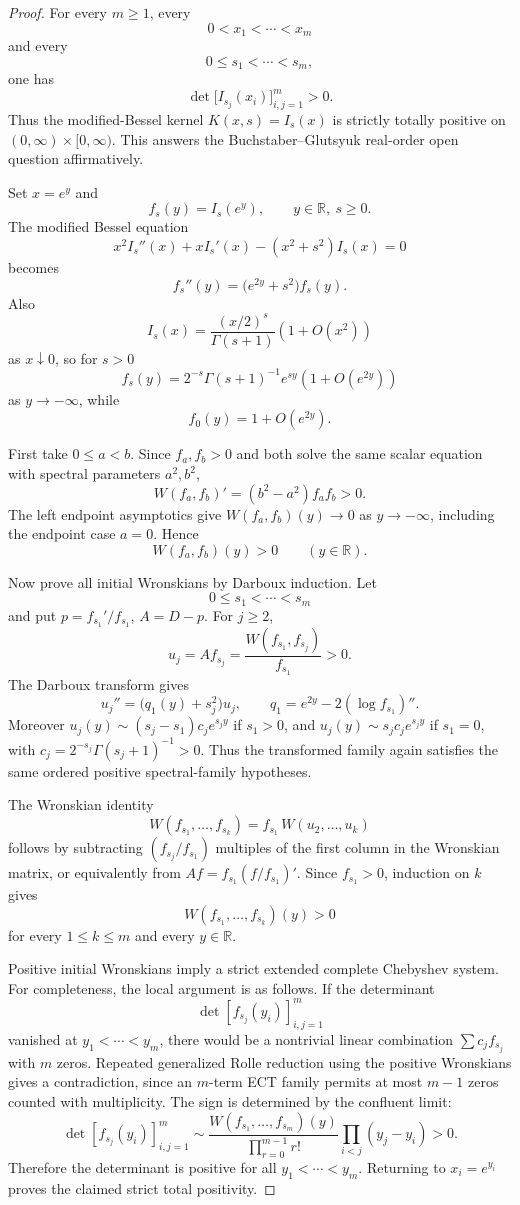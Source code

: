 \documentclass[11pt]{article}
\numberwithin{equation}{section}
\theoremstyle{definition}
\theoremstyle{remark}
\newcommand{\1}{\mathbf 1}
\begin{document}
\begin{proof}
For every \(m\ge 1\), every
\[
0<x_1<\cdots<x_m
\]
and every
\[
0\le s_1<\cdots<s_m,
\]
one has
\[
\det\big[I_{s_j}(x_i)\big]_{i,j=1}^m>0.
\]
Thus the modified-Bessel kernel \(K(x,s)=I_s(x)\) is strictly totally positive on \((0,\infty)\times[0,\infty)\). This answers the Buchstaber--Glutsyuk real-order open question affirmatively.

Set \(x=e^y\) and
\[
f_s(y)=I_s(e^y),\qquad y\in\mathbb R,\ s\ge0.
\]
The modified Bessel equation
\[
x^2I_s''(x)+xI_s'(x)-(x^2+s^2)I_s(x)=0
\]
becomes
\[
f_s''(y)=\big(e^{2y}+s^2\big)f_s(y).
\]
Also
\[
I_s(x)=\frac{(x/2)^s}{\Gamma(s+1)}(1+O(x^2))
\]
as \(x\downarrow0\), so for \(s>0\)
\[
f_s(y)=2^{-s}\Gamma(s+1)^{-1}e^{sy}(1+O(e^{2y}))
\]
as \(y\to-\infty\), while
\[
f_0(y)=1+O(e^{2y}).
\]

First take \(0\le a<b\). Since \(f_a,f_b>0\) and both solve the same scalar equation with spectral parameters \(a^2,b^2\),
\[
W(f_a,f_b)'=(b^2-a^2)f_af_b>0.
\]
The left endpoint asymptotics give \(W(f_a,f_b)(y)\to0\) as \(y\to-\infty\), including the endpoint case \(a=0\). Hence
\[
W(f_a,f_b)(y)>0\qquad (y\in\mathbb R).
\]

Now prove all initial Wronskians by Darboux induction. Let
\[
0\le s_1<\cdots<s_m
\]
and put \(p=f_{s_1}'/f_{s_1}\), \(A=D-p\). For \(j\ge2\),
\[
u_j=Af_{s_j}=\frac{W(f_{s_1},f_{s_j})}{f_{s_1}}>0.
\]
The Darboux transform gives
\[
u_j''=\big(q_1(y)+s_j^2\big)u_j,\qquad
q_1=e^{2y}-2(\log f_{s_1})''.
\]
Moreover \(u_j(y)\sim (s_j-s_1)c_j e^{s_jy}\) if \(s_1>0\), and \(u_j(y)\sim s_jc_je^{s_jy}\) if \(s_1=0\), with \(c_j=2^{-s_j}\Gamma(s_j+1)^{-1}>0\). Thus the transformed family again satisfies the same ordered positive spectral-family hypotheses.

The Wronskian identity
\[
W(f_{s_1},\ldots,f_{s_k})=f_{s_1}\,W(u_2,\ldots,u_k)
\]
follows by subtracting \((f_{s_j}/f_{s_1})\) multiples of the first column in the Wronskian matrix, or equivalently from \(Af=f_{s_1}(f/f_{s_1})'\). Since \(f_{s_1}>0\), induction on \(k\) gives
\[
W(f_{s_1},\ldots,f_{s_k})(y)>0
\]
for every \(1\le k\le m\) and every \(y\in\mathbb R\).

Positive initial Wronskians imply a strict extended complete Chebyshev system. For completeness, the local argument is as follows. If the determinant
\[
\det[f_{s_j}(y_i)]_{i,j=1}^m
\]
vanished at \(y_1<\cdots<y_m\), there would be a nontrivial linear combination \(\sum c_j f_{s_j}\) with \(m\) zeros. Repeated generalized Rolle reduction using the positive Wronskians gives a contradiction, since an \(m\)-term ECT family permits at most \(m-1\) zeros counted with multiplicity. The sign is determined by the confluent limit:
\[
\det[f_{s_j}(y_i)]_{i,j=1}^m
\sim
\frac{W(f_{s_1},\ldots,f_{s_m})(y)}{\prod_{r=0}^{m-1}r!}
\prod_{i<j}(y_j-y_i)>0.
\]
Therefore the determinant is positive for all \(y_1<\cdots<y_m\). Returning to \(x_i=e^{y_i}\) proves the claimed strict total positivity.
\end{proof}
\end{document}
